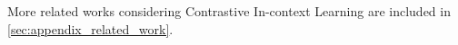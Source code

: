 More related works considering Contrastive In-context Learning are included in \cref{sec:appendix_related_work}.


%